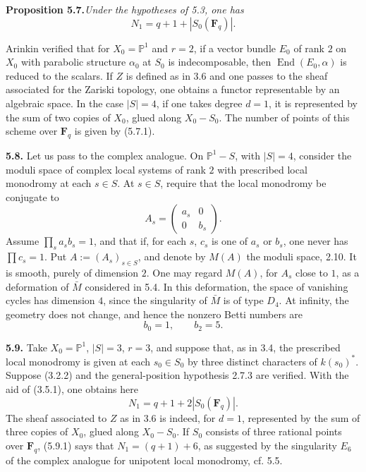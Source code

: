 \documentclass[11pt]{article}
\newcommand{\Fq}{\mathbf{F}_q}
\newcommand{\End}{\operatorname{End}}
\newcommand{\Pone}{\mathbb{P}^{1}}
\newcommand{\para}[1]{\medskip\noindent\textbf{#1}\enspace}
\begin{document}
\noindent\textbf{Proposition 5.7.}\quad\textit{Under the hypotheses of 5.3, one has}
\begin{equation}
  N_1=q+1+|S_0(\Fq)|.
\tag{5.7.1}
\end{equation}

Arinkin verified that for \(X_0=\Pone\) and \(r=2\), if a vector bundle \(E_0\) of rank \(2\) on \(X_0\) with parabolic structure \(\alpha_0\) at \(S_0\) is indecomposable, then \(\End(E_0,\alpha)\) is reduced to the scalars. If \(Z\) is defined as in 3.6 and one passes to the sheaf associated for the Zariski topology, one obtains a functor representable by an algebraic space. In the case \(|S|=4\), if one takes degree \(d=1\), it is represented by the sum of two copies of \(X_0\), glued along \(X_0-S_0\). The number of points of this scheme over \(\Fq\) is given by (5.7.1).

\para{5.8.} Let us pass to the complex analogue. On \(\Pone-S\), with \(|S|=4\), consider the moduli space of complex local systems of rank \(2\) with prescribed local monodromy at each \(s\in S\). At \(s\in S\), require that the local monodromy be conjugate to
\[
  A_s=\begin{pmatrix} a_s&0\\0&b_s\end{pmatrix}.
\]
Assume \(\prod_s a_s b_s=1\), and that if, for each \(s\), \(c_s\) is one of \(a_s\) or \(b_s\), one never has \(\prod c_s=1\). Put \(A:=(A_s)_{s\in S}\), and denote by \(M(A)\) the moduli space, 2.10. It is smooth, purely of dimension \(2\). One may regard \(M(A)\), for \(A_s\) close to \(1\), as a deformation of \(\bar M\) considered in 5.4. In this deformation, the space of vanishing cycles has dimension \(4\), since the singularity of \(\bar M\) is of type \(D_4\). At infinity, the geometry does not change, and hence the nonzero Betti numbers are
\begin{equation}
  b_0=1,\qquad b_2=5.
\tag{5.4.1}
\end{equation}

\para{5.9.} Take \(X_0=\Pone\), \(|S|=3\), \(r=3\), and suppose that, as in 3.4, the prescribed local monodromy is given at each \(s_0\in S_0\) by three distinct characters of \(k(s_0)^*\). Suppose (3.2.2) and the general-position hypothesis 2.7.3 are verified. With the aid of (3.5.1), one obtains here
\begin{equation}
  N_1=q+1+2|S_0(\Fq)|.
\tag{5.9.1}
\end{equation}
The sheaf associated to \(Z\) as in 3.6 is indeed, for \(d=1\), represented by the sum of three copies of \(X_0\), glued along \(X_0-S_0\). If \(S_0\) consists of three rational points over \(\Fq\), (5.9.1) says that \(N_1=(q+1)+6\), as suggested by the singularity \(E_6\) of the complex analogue for unipotent local monodromy, cf. 5.5.
\end{document}
